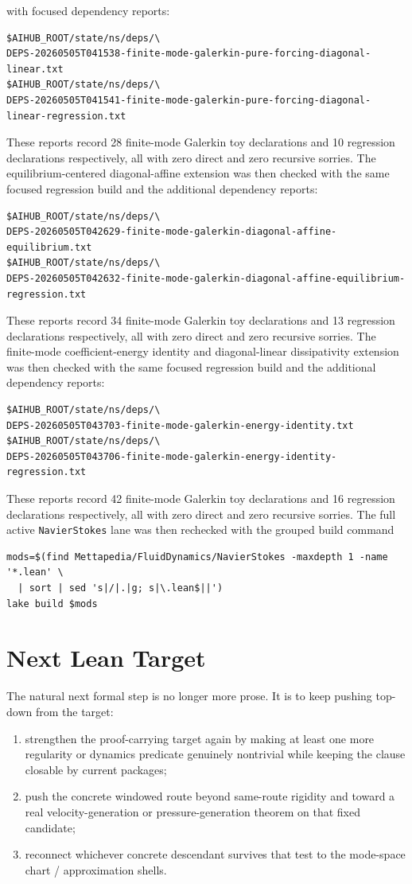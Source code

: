 \documentclass[11pt]{article}
\begin{document}
with focused dependency reports:
\begin{verbatim}
$AIHUB_ROOT/state/ns/deps/\
DEPS-20260505T041538-finite-mode-galerkin-pure-forcing-diagonal-linear.txt
$AIHUB_ROOT/state/ns/deps/\
DEPS-20260505T041541-finite-mode-galerkin-pure-forcing-diagonal-linear-regression.txt
\end{verbatim}
These reports record 28 finite-mode Galerkin toy declarations and 10
regression declarations respectively, all with zero direct and zero recursive
sorries.
The equilibrium-centered diagonal-affine extension was then checked with the
same focused regression build and the additional dependency reports:
\begin{verbatim}
$AIHUB_ROOT/state/ns/deps/\
DEPS-20260505T042629-finite-mode-galerkin-diagonal-affine-equilibrium.txt
$AIHUB_ROOT/state/ns/deps/\
DEPS-20260505T042632-finite-mode-galerkin-diagonal-affine-equilibrium-regression.txt
\end{verbatim}
These reports record 34 finite-mode Galerkin toy declarations and 13
regression declarations respectively, all with zero direct and zero recursive
sorries.
The finite-mode coefficient-energy identity and diagonal-linear dissipativity
extension was then checked with the same focused regression build and the
additional dependency reports:
\begin{verbatim}
$AIHUB_ROOT/state/ns/deps/\
DEPS-20260505T043703-finite-mode-galerkin-energy-identity.txt
$AIHUB_ROOT/state/ns/deps/\
DEPS-20260505T043706-finite-mode-galerkin-energy-identity-regression.txt
\end{verbatim}
These reports record 42 finite-mode Galerkin toy declarations and 16
regression declarations respectively, all with zero direct and zero recursive
sorries.
The full active \texttt{NavierStokes} lane was then rechecked with the grouped
build command
\begin{verbatim}
mods=$(find Mettapedia/FluidDynamics/NavierStokes -maxdepth 1 -name '*.lean' \
  | sort | sed 's|/|.|g; s|\.lean$||')
lake build $mods
\end{verbatim}

\section{Next Lean Target}

The natural next formal step is no longer more prose.  It is to keep pushing
top-down from the target:
\begin{enumerate}[leftmargin=1.5em]
  \item strengthen the proof-carrying target again by making at least one more
  regularity or dynamics predicate genuinely nontrivial while keeping the clause
  closable by current packages;
  \item push the concrete windowed route beyond same-route rigidity and toward a
  real velocity-generation or pressure-generation theorem on that fixed
  candidate;
  \item reconnect whichever concrete descendant survives that test to the
  mode-space chart / approximation shells.
\end{enumerate}
\end{document}
